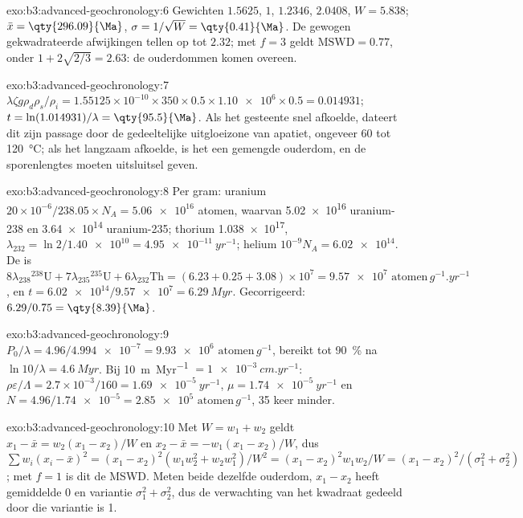 \begin{solution}{exo:b3:advanced-geochronology:6}
Gewichten $1.5625$, $1$, $1.2346$, $2.0408$, $W = 5.838$; $\bar x =
\qty{296.09}{\Ma}$, $\sigma = 1/\sqrt W = \qty{0.41}{\Ma}$. De gewogen
gekwadrateerde afwijkingen tellen op tot $2.32$; met $f = 3$ geldt $\mathrm{MSWD} = 0.77$, onder
$1 + 2\sqrt{2/3} = 2.63$: de ouderdommen komen overeen.
\end{solution}

\begin{solution}{exo:b3:advanced-geochronology:7}
$\lambda\zeta g\rho_d\rho_s/\rho_i = 1.55125\times10^{-10}\times350\times0.5
\times\num{1.10e6}\times0.5 = 0.014931$; $t = \ln(1.014931)/\lambda =
\qty{95.5}{\Ma}$. Als het gesteente snel afkoelde, dateert dit zijn passage door de
gedeeltelijke uitgloeizone van apatiet, ongeveer 60 tot \qty{120}{\celsius}; als het
langzaam afkoelde, is het een gemengde ouderdom, en de sporenlengtes moeten uitsluitsel geven.
\end{solution}

\begin{solution}{exo:b3:advanced-geochronology:8}
Per gram: uranium $20\times10^{-6}/238.05\times N_A = \num{5.06e16}$ atomen, waarvan
\num{5.02e16} uranium-238 en \num{3.64e14} uranium-235; thorium
\num{1.038e17}, $\lambda_{232} = \ln 2/\num{1.40e10} = \qty{4.95e-11}{yr^{-1}}$;
helium $10^{-9}N_A = \num{6.02e14}$. De  is
$8\lambda_{238}{}^{238}\mathrm U + 7\lambda_{235}{}^{235}\mathrm U +
6\lambda_{232}\mathrm{Th} = (6.23 + 0.25 + 3.08)\times10^7 =
\num{9.57e7}\text{ atomen}\,\unit{g^{-1}.yr^{-1}}$, en $t = \num{6.02e14}/\num{9.57e7} =
\qty{6.29}{Myr}$. Gecorrigeerd: $6.29/0.75 = \qty{8.39}{\Ma}$.
\end{solution}

\begin{solution}{exo:b3:advanced-geochronology:9}
$P_0/\lambda = 4.96/\num{4.994e-7} = \num{9.93e6}\text{ atomen}\,\unit{g^{-1}}$, bereikt tot
\qty{90}{\percent} na $\ln 10/\lambda = \qty{4.6}{Myr}$. Bij
\qty{10}{m.Myr^{-1}} $= \qty{1e-3}{cm.yr^{-1}}$: $\rho\varepsilon/\Lambda =
2.7\times10^{-3}/160 = \qty{1.69e-5}{yr^{-1}}$, $\mu = \qty{1.74e-5}{yr^{-1}}$
en $N = 4.96/\num{1.74e-5} = \num{2.85e5}\text{ atomen}\,\unit{g^{-1}}$, 35 keer minder.
\end{solution}

\begin{solution}{exo:b3:advanced-geochronology:10}
Met $W = w_1 + w_2$ geldt $x_1 - \bar x = w_2(x_1 - x_2)/W$ en $x_2 - \bar x =
-w_1(x_1 - x_2)/W$, dus $\sum w_i(x_i - \bar x)^2 = (x_1 - x_2)^2(w_1w_2^2 +
w_2w_1^2)/W^2 = (x_1 - x_2)^2w_1w_2/W = (x_1 - x_2)^2/(\sigma_1^2 +
\sigma_2^2)$; met $f = 1$ is dit de MSWD. Meten beide dezelfde ouderdom,
$x_1 - x_2$ heeft gemiddelde 0 en variantie $\sigma_1^2 + \sigma_2^2$, dus de
verwachting van het kwadraat gedeeld door die variantie is 1.
\end{solution}

